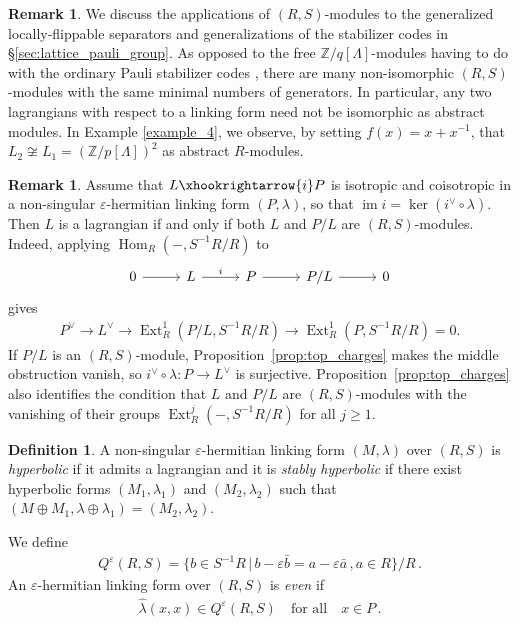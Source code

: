 \documentclass[sn-mathphys-num]{sn-jnl}
\theoremstyle{definition}
\newtheorem{definition}[lemma]{Definition}
\newtheorem{remark}[lemma]{Remark}
\numberwithin{equation}{section}
\theoremstyle{definition}
\def\ep{\varepsilon}
\def\IZ{{\mathbb{Z}}}
\def\La{{\Lambda}}
\def\l{{\lambda}}
\def\hl{{\hat \lambda}}
\def\Im{\operatorname{im}}
\def\ker{\operatorname{ker}}
\def\Hom{\operatorname{Hom}}
\def\ext{\operatorname{Ext}}
\begin{document}
\begin{remark}
    We discuss the applications of $(R,S)$-modules to the generalized locally-flippable separators and generalizations of the stabilizer codes in \S \ref{sec:lattice_pauli_group}. As opposed to the free $\IZ/q[\La]$-modules having to do with the ordinary Pauli stabilizer codes \cite{haah2013}, there are many non-isomorphic $(R,S)$-modules with the same minimal numbers of generators. In particular, any two lagrangians with respect to a linking form need not be isomorphic as abstract modules. In Example \ref{example_4},  we observe, by setting $f(x) = x + x^{-1}$, that $L_2 \not\cong L_1 = (\mathbb{Z}/p[\Lambda])^2$ as abstract $R$-modules.
\end{remark}

\begin{remark}\label{remark:topological charges} 
Assume that $L\xhookrightarrow{i}P$ is isotropic and coisotropic in a non-singular $\ep$-hermitian linking form $(P,\l)$, so that $\Im i=\ker(i^{\vee}\circ\l)$. Then $L$ is a lagrangian if and only if both $L$ and $P/L$ are $(R,S)$-modules. Indeed, applying $\Hom_R(-,S^{-1}R/R)$ to \begin{align} 
\begin{tikzcd}[ampersand replacement=\&, column sep=27pt] 0 \arrow[r]\& L \arrow[r,"i"]\& P \arrow[r]\& P/L \arrow[r]\& 0
\end{tikzcd}
\end{align} gives 
\begin{align} P^{\vee}\longrightarrow L^{\vee}\longrightarrow \ext_R^1(P/L,S^{-1}R/R)\longrightarrow \ext_R^1(P,S^{-1}R/R)=0. 
\end{align} 
If $P/L$ is an $(R,S)$-module, Proposition~\ref{prop:top_charges} makes the middle obstruction vanish, so $i^{\vee}\circ\l:P\to L^{\vee}$ is surjective. Proposition~\ref{prop:top_charges} also identifies the condition that $L$ and $P/L$ are $(R,S)$-modules with the vanishing of their groups $\ext_R^j(-,S^{-1}R/R)$ for all $j\geqslant1$.
\end{remark}

\begin{definition}
A non-singular $\ep$-hermitian linking form $(M,\l)$ over $(R,S)$ is \textit{hyperbolic} if it admits a lagrangian and it is \textit{stably hyperbolic} if there exist hyperbolic forms $(M_1,\l_1)$ and $(M_2,\l_2)$ such that $(M\oplus M_1,\l\oplus \l_1)=(M_2,\l_2)$. 
    
\end{definition}
We define \begin{align}
    Q^{\ep}(R,S)=\{b\in S^{-1}R\,|\,b-\ep \bar b=a-\ep \bar a\,,a\in R \}/R\,.
\end{align}
An $\ep$-hermitian linking form over $(R,S)$ is \textit{even} if 
\begin{align}
    \hl(x,x)\in  Q^{\ep}(R,S)\quad \mbox{for all}\quad x\in P\,.
\end{align}
\end{document}
